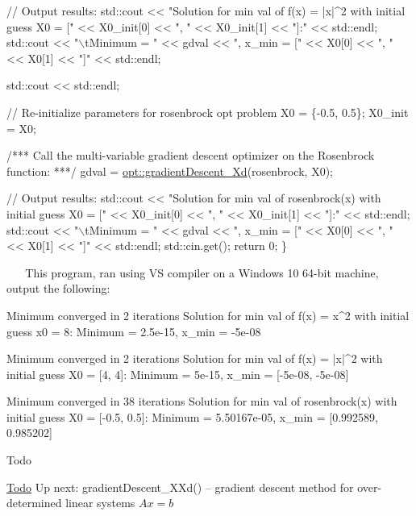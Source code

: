 \begin{DoxyCodeInclude}
    \textcolor{comment}{// Output results:}
    std::cout << \textcolor{stringliteral}{"Solution for min val of f(x) = |x|^2 with initial guess X0 = ["} << X0\_init[0] << \textcolor{stringliteral}{", "} << 
      X0\_init[1] << \textcolor{stringliteral}{"]:"} << std::endl;
    std::cout << \textcolor{stringliteral}{"\(\backslash\)tMinimum = "} << gdval << \textcolor{stringliteral}{", x\_min = ["} << X0[0] << \textcolor{stringliteral}{", "} << X0[1] << \textcolor{stringliteral}{"]"} << std::endl;

    std::cout << std::endl;

    \textcolor{comment}{// Re-initialize parameters for rosenbrock opt problem}
    X0 = \{-0.5, 0.5\};
    X0\_init = X0;

    \textcolor{comment}{/*** Call the multi-variable gradient descent optimizer on the Rosenbrock function: ***/}
    gdval = \mbox{\hyperlink{namespaceopt_a7db27c86e1c5a503b7f8373ba067d97b}{opt::gradientDescent\_Xd}}(rosenbrock, X0);

    \textcolor{comment}{// Output results:}
    std::cout << \textcolor{stringliteral}{"Solution for min val of rosenbrock(x) with initial guess X0 = ["} << X0\_init[0] << \textcolor{stringliteral}{", "} <<
       X0\_init[1] << \textcolor{stringliteral}{"]:"} << std::endl;
    std::cout << \textcolor{stringliteral}{"\(\backslash\)tMinimum = "} << gdval << \textcolor{stringliteral}{", x\_min = ["} << X0[0] << \textcolor{stringliteral}{", "} << X0[1] << \textcolor{stringliteral}{"]"} << std::endl;
    std::cin.get();
    \textcolor{keywordflow}{return} 0;
\}
\end{DoxyCodeInclude}
 ~\newline
~\newline
 This program, ran using VS compiler on a Windows 10 64-\/bit machine, output the following\+: ~\newline
 
\begin{DoxyCode}
Minimum converged in 2 iterations
Solution for min val of f(x) = x^2 with initial guess x0 = 8:
    Minimum = 2.5e-15, x\_min = -5e-08

Minimum converged in 2 iterations
Solution for min val of f(x) = |x|^2 with initial guess X0 = [4, 4]:
    Minimum = 5e-15, x\_min = [-5e-08, -5e-08]

Minimum converged in 38 iterations
Solution for min val of rosenbrock(x) with initial guess X0 = [-0.5, 0.5]:
    Minimum = 5.50167e-05, x\_min = [0.992589, 0.985202]
\end{DoxyCode}
 \begin{DoxyRefDesc}{Todo}
\item[\mbox{\hyperlink{todo__todo000001}{Todo}}]Up next\+: gradient\+Descent\+\_\+\+X\+Xd() -- gradient descent method for over-\/determined linear systems $Ax=b$ \end{DoxyRefDesc}


